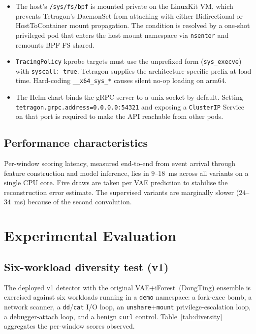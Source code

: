 \begin{itemize}
  \item The host's \texttt{/sys/fs/bpf} is mounted private on the
        LinuxKit VM, which prevents Tetragon's DaemonSet from
        attaching with either Bidirectional or HostToContainer mount
        propagation. The condition is resolved by a one-shot
        privileged pod that enters the host mount namespace via
        \texttt{nsenter} and remounts BPF FS shared.
  \item \texttt{TracingPolicy} kprobe targets must use the unprefixed
        form (\texttt{sys\_execve}) with \texttt{syscall: true}.
        Tetragon supplies the architecture-specific prefix at load
        time. Hard-coding \texttt{\_\_x64\_sys\_*} causes silent
        no-op loading on arm64.
  \item The Helm chart binds the gRPC server to a unix socket by
        default. Setting
        \texttt{tetragon.grpc.address=0.0.0.0:54321} and exposing a
        \texttt{ClusterIP} Service on that port is required to make
        the API reachable from other pods.
\end{itemize}

\subsection{Performance characteristics}
Per-window scoring latency, measured end-to-end from event arrival
through feature construction and model inference, lies in
$9$--$18$~ms across all variants on a single CPU core. Five
draws are taken per VAE prediction to stabilise the reconstruction
error estimate. The supervised variants are marginally slower
($24$--$34$~ms) because of the second convolution.

\FloatBarrier
\section{Experimental Evaluation}
\label{sec:evaluation}

\subsection{Six-workload diversity test (v1)}
\label{subsec:diversity}
The deployed v1 detector with the original VAE+iForest~(DongTing)
ensemble is exercised against six workloads running in a
\texttt{demo} namespace: a fork-exec bomb, a network scanner, a
\texttt{dd}/\texttt{cat} I/O loop, an \texttt{unshare}+\texttt{mount}
privilege-escalation loop, a debugger-attach loop, and a benign
\texttt{curl} control. Table~\ref{tab:diversity} aggregates the
per-window scores observed.

